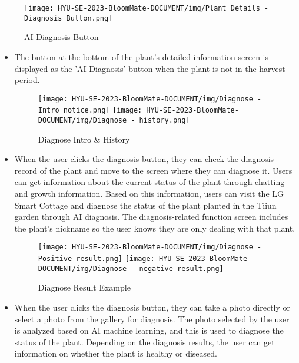 \documentclass[conference, a4paper]{IEEEtran}
\begin{document}
\begin{enumerate}
        \begin{figure}[h]
        \centering
        \texttt{[image: HYU-SE-2023-BloomMate-DOCUMENT/img/Plant Details - Diagnosis Button.png]}
        \caption{AI Diagnosis Button}
        \label{fig:AI Diagnosis Button}
        \end{figure}
    \begin{itemize}
        \item The button at the bottom of the plant's detailed information screen is displayed as the 'AI Diagnosis' button when the plant is not in the harvest period. 
        \begin{figure}[h]
    \centerline{
        \texttt{[image: HYU-SE-2023-BloomMate-DOCUMENT/img/Diagnose - Intro notice.png]}
        \texttt{[image: HYU-SE-2023-BloomMate-DOCUMENT/img/Diagnose - history.png]}
    }
    \label{fig}
    \caption{Diagnose Intro \& History}
    \end{figure}
    \item When the user clicks the diagnosis button, they can check the diagnosis record of the plant and move to the screen where they can diagnose it. Users can get information about the current status of the plant through chatting and growth information. Based on this information, users can visit the LG Smart Cottage and diagnose the status of the plant planted in the Tiiun garden through AI diagnosis. The diagnosis-related function screen includes the plant's nickname so the user knows they are only dealing with that plant.
    \begin{figure}[h]
    \centerline{
        \texttt{[image: HYU-SE-2023-BloomMate-DOCUMENT/img/Diagnose - Positive result.png]}
        \texttt{[image: HYU-SE-2023-BloomMate-DOCUMENT/img/Diagnose - negative result.png]}
    }
    \label{fig}
    \caption{Diagnose Result Example}
    \end{figure}
    \item When the user clicks the diagnosis button, they can take a photo directly or select a photo from the gallery for diagnosis. The photo selected by the user is analyzed based on AI machine learning, and this is used to diagnose the status of the plant. Depending on the diagnosis results, the user can get information on whether the plant is healthy or diseased.


\end{itemize}
\end{enumerate}
\end{document}
